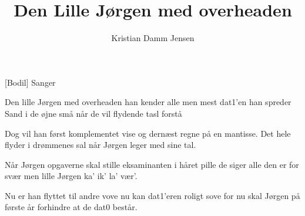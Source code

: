 \documentclass[a4paper,11pt]{article}
\title{Den Lille Jørgen med overheaden}
\author{Kristian Damm Jensen}
\begin{document}
\maketitle

\begin{roles}
    [Bodil] Sanger 
\end{roles}

\begin{song}
   Den lille Jørgen med overheaden
            han kender alle men mest dat1'en
            han spreder Sand i de øjne små
            når de vil flydende tasl forstå

            Dog vil han først komplementet vise
            og dernæst regne på en mantisse.
            Det hele flyder i drømmenes sal
            når Jørgen leger med sine tal.

            Når Jørgen opgaverne skal stille
            eksaminanten i håret pille
            de siger alle den er for svær
            men lille Jørgen ka' ik' la' vær'.

            Nu er han flyttet til andre vove
            nu kan dat1'eren roligt sove
            for nu skal Jørgen på første år
            forhindre at de dat0 består.
\end{song}
\end{document}
